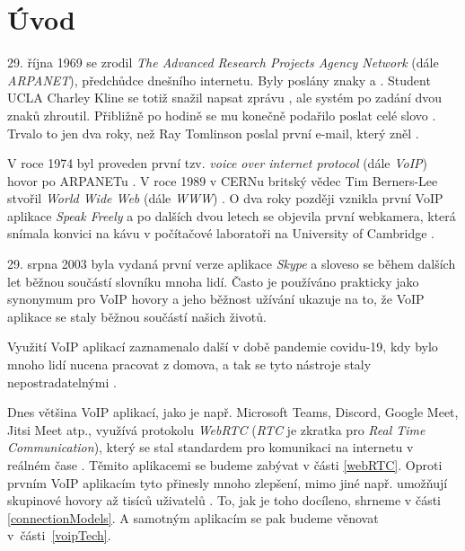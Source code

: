 \section{Úvod}

29. října 1969 se zrodil \textit{The Advanced Research Projects Agency Network}
(dále \textit{ARPANET}), předchůdce dnešního internetu. Byly poslány znaky
 a . Student UCLA Charley Kline se totiž snažil napsat zprávu
, ale systém po zadání dvou znaků zhroutil. Přibližně po hodině se mu
konečně podařilo poslat celé slovo
\cite{PBS-SimpleHelloFirstMessageOverARPANET}. Trvalo to jen dva roky, než Ray
Tomlinson poslal první e-mail, který zněl 
\cite{YahooFinance-SimpleHelloFirstMessageOverARPANET}.

V roce 1974 byl proveden první tzv. \textit{voice over internet protocol} (dále
\textit{VoIP}) hovor po ARPANETu
\cite{DigiFone-WhatYouMightNotKnowAboutTheHistoryOfVoIP}. V roce 1989 v CERNu
britský vědec Tim Berners-Lee stvořil \textit{World Wide Web} (dále
\textit{WWW}) \cite{CERN-TheBirthOfTheWeb}. O dva roky později vznikla první
VoIP aplikace \textit{Speak Freely}
\cite{DigiFone-WhatYouMightNotKnowAboutTheHistoryOfVoIP} a po dalších dvou
letech se objevila první webkamera, která snímala konvici na kávu v počítačové
laboratoři na University of Cambridge \cite{BBC-FirstWebcamMadeCoffeePotFamous}.

29. srpna 2003 byla vydaná první verze aplikace \textit{Skype}
\cite{ArsTechnica-TheStrangeStoryOfSkype} a sloveso  se během
dalších let běžnou součástí slovníku mnoha lidí. Často je používáno prakticky
jako synonymum pro VoIP hovory a jeho běžnost užívání ukazuje na to, že VoIP
aplikace se staly běžnou součástí našich životů.

Využití VoIP aplikací zaznamenalo další  v době pandemie covidu-19, kdy
bylo mnoho lidí nucena pracovat z domova, a tak se tyto nástroje staly
nepostradatelnými \cite{OnSIP-VoIPStatsTrendsCovidImpact}.

Dnes většina VoIP aplikací, jako je např. Microsoft Teams, Discord, Google Meet,
Jitsi Meet atp., využívá protokolu \textit{WebRTC} (\textit{RTC} je zkratka pro
\textit{Real Time Communication}), který se stal standardem pro komunikaci na
internetu v reálném čase \cite{LevelUp-WhatPowerMeetAndTeams,
	Discord-HowDoesItHandleMillionsOfUsers, Jitsi-Projects, WebRTCORG-Homepage}.
Těmito aplikacemi se budeme zabývat v části \ref{webRTC}. Oproti prvním VoIP
aplikacím tyto přinesly mnoho zlepšení, mimo jiné např. umožňují skupinové
hovory až tisíců uživatelů \cite{MicrosoftLearn-MSTeamsLimitsAndSpecs}. To, jak
je toho docíleno, shrneme v části \ref{connectionModels}. A samotným aplikacím
se pak budeme věnovat v~části~\ref{voipTech}.

